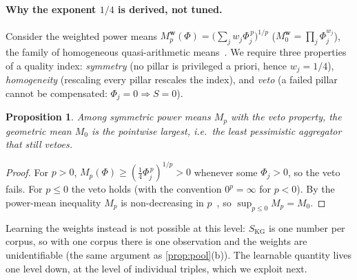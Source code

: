\documentclass[10pt,twocolumn]{article}
\newtheorem{proposition}{Proposition}
\theoremstyle{remark}
\begin{document}
\paragraph{Why the exponent $1/4$ is derived, not tuned.}
Consider the weighted power means $M_p^{\bm w}(\Phi)=\big(\sum_j w_j\Phi_j^{\,p}\big)^{1/p}$ ($M_0^{\bm w}=\prod_j\Phi_j^{w_j}$),
the family of homogeneous quasi-arithmetic means~\cite{hardy1934inequalities}. We require three properties of a
quality index: \emph{symmetry} (no pillar is privileged a priori, hence $w_j=1/4$), \emph{homogeneity}
(rescaling every pillar rescales the index), and \emph{veto} (a failed pillar cannot be compensated: $\Phi_j=0\Rightarrow
S=0$).
\begin{proposition}\label{prop:gm}
Among symmetric power means $M_p$ with the veto property, the geometric mean $M_0$ is the pointwise largest, i.e.\ the
least pessimistic aggregator that still vetoes.
\end{proposition}
\begin{proof}
For $p>0$, $M_p(\Phi)\ge(\tfrac14\Phi_j^{\,p})^{1/p}>0$ whenever some $\Phi_j>0$, so the veto fails. For $p\le0$ the veto
holds (with the convention $0^{p}=\infty$ for $p<0$). By the power-mean inequality $M_p$ is non-decreasing in
$p$~\cite{hardy1934inequalities}, so $\sup_{p\le0}M_p=M_0$.
\end{proof}
Learning the weights instead is not possible at this level: $S_{\mathrm{KG}}$ is one number per corpus, so with one
corpus there is one observation and the weights are unidentifiable (the same argument as \cref{prop:pool}(b)). The
learnable quantity lives one level down, at the level of individual triples, which we exploit next.
\end{document}
